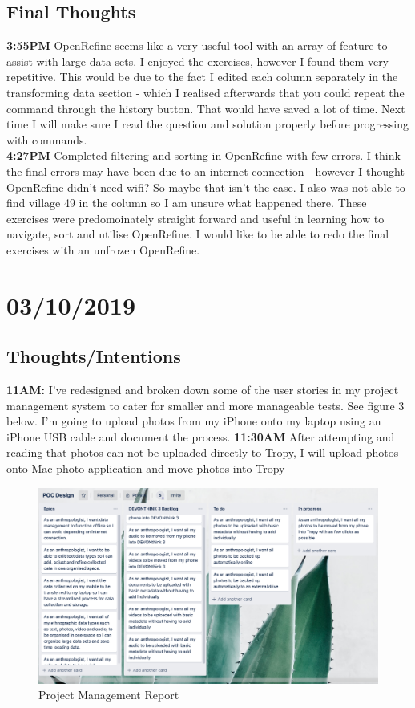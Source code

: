 \documentclass{article}
\begin{document}
\subsection{Final Thoughts}
\textbf{3:55PM} OpenRefine seems like a very useful tool with an array of feature to assist with large data sets. I enjoyed the exercises, however I found them very repetitive. This would be due to the fact I edited each column separately in the transforming data section - which I realised afterwards that you could repeat the command through the history button. That would have saved a lot of time. Next time I will make sure I read the question and solution properly before progressing with commands. \\
\textbf{4:27PM} Completed filtering and sorting in OpenRefine with few errors. I think the final errors may have been due to an internet connection - however I thought OpenRefine didn't need wifi? So maybe that isn't the case. I also was not able to find village 49 in the column so I am unsure what happened there. These exercises were predomoinately straight forward and useful in learning how to navigate, sort and utilise OpenRefine. I would like to be able to redo the final exercises with an unfrozen OpenRefine.
\clearpage

\section{03/10/2019}
\subsection{Thoughts/Intentions}
\textbf{11AM:} I've redesigned and broken down some of the user stories in my project management system to cater for smaller and more manageable tests. See figure 3 below. I'm going to upload photos from my iPhone onto my laptop using an iPhone USB cable and document the process.
\textbf{11:30AM} After attempting and reading that photos can not be uploaded directly to Tropy, I will upload photos onto Mac photo application and move photos into Tropy
\\
\begin{figure}[H]
    \centering
    \includegraphics[width=\textwidth]{Images/Trello1.png}
    \caption{Project Management Report}
    \label{fig:my_label}
\end{figure}
\end{document}
